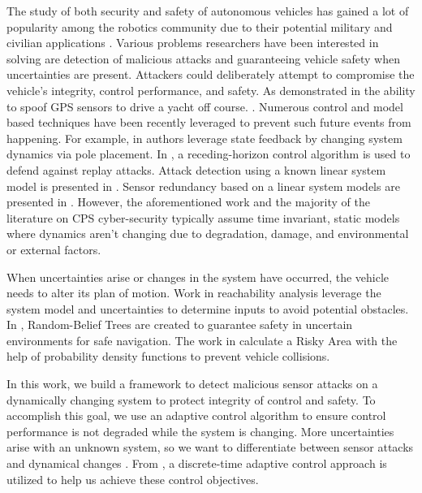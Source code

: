 The study of both security and safety of autonomous vehicles has gained a lot of popularity among the robotics community due to their potential military and civilian applications . Various problems researchers have been interested in solving are detection of malicious attacks and guaranteeing vehicle safety when uncertainties are present. Attackers could deliberately attempt to compromise the vehicle's integrity, control performance, and safety.  As demonstrated in \cite{lee} the ability to spoof GPS sensors to drive a yacht off course. . Numerous control and model based techniques have been recently leveraged to prevent such future events from happening. For example, in \cite{6426811} authors leverage state feedback by changing system dynamics via pole placement. In \cite{zhu2012resilient}, a receding-horizon control algorithm is used to defend against replay attacks. Attack detection using a known linear system model is presented in \cite{pasqualetti2013attack}. Sensor redundancy based on a linear system models are presented in \cite{fawzi2014secure,6943080,7330811} . However, the aforementioned work and the majority of the literature on CPS cyber-security typically assume time invariant, static models where dynamics aren't changing due to degradation, damage, and environmental or external factors.

When uncertainties arise or changes in the system have occurred, the vehicle needs to alter its plan of motion. Work in reachability analysis \cite{8046382,7799325,5980268} leverage the system model and uncertainties to determine inputs to avoid potential obstacles. In \cite{5980508}, Random-Belief Trees are created to guarantee safety in uncertain environments for safe navigation. The work in \cite{6934041} calculate a Risky Area with the help of probability density functions to prevent vehicle collisions. 


In this work, we build a framework to detect malicious sensor attacks on a dynamically changing system to protect integrity of control and safety. To accomplish this goal, we use an adaptive control algorithm to ensure control performance is not degraded while the system is changing. More uncertainties arise with an unknown system, so we want to differentiate between sensor attacks and dynamical changes .  From \cite{tao2003adaptive,Goodwin1643720}, a  discrete-time adaptive control approach is utilized to help us achieve these control objectives.

